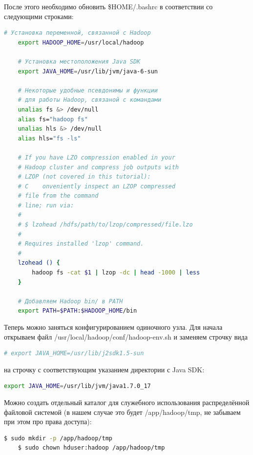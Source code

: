 \documentclass[12pt,a4paper]{extarticle} %
\begin{document}
\noindent После этого необходимо обновить \$HOME/.bashrc в соответствии со следующими строками:
\begin{lstlisting}[language=sh]
    # Установка переменной, связанной с Hadoop
    export HADOOP_HOME=/usr/local/hadoop

    # Установка местоположения Java SDK
    export JAVA_HOME=/usr/lib/jvm/java-6-sun

    # Некоторые удобные псевдонимы и функции
    # для работы Hadoop, связаной с командами
    unalias fs &> /dev/null
    alias fs="hadoop fs"
    unalias hls &> /dev/null
    alias hls="fs -ls"

    # If you have LZO compression enabled in your 
    # Hadoop cluster and compress job outputs with 
    # LZOP (not covered in this tutorial):
    # C    onveniently inspect an LZOP compressed 
    # file from the command
    # line; run via:
    #
    # $ lzohead /hdfs/path/to/lzop/compressed/file.lzo
    #
    # Requires installed 'lzop' command.
    #
    lzohead () {
        hadoop fs -cat $1 | lzop -dc | head -1000 | less
    }

    # Добавляем Hadoop bin/ в PATH
    export PATH=$PATH:$HADOOP_HOME/bin
\end{lstlisting}

\noindent Теперь можно заняться конфигурированием одиночного узла. Для начала открываем файл /usr/local/hadoop/conf/hadoop-env.sh и заменяем строчку вида
\begin{lstlisting}[language=sh]
    # export JAVA_HOME=/usr/lib/j2sdk1.5-sun
\end{lstlisting}
на строчку с соответствующим указанием директории с Java SDK:
\begin{lstlisting}[language=sh]
    export JAVA_HOME=/usr/lib/jvm/java1.7.0_17
\end{lstlisting}

\noindent Можно создать отдельный каталог для служебного использования распределённой файловой системой (в нашем случае это будет /app/hadoop/tmp, не забываем при этом про права доступа):
\begin{lstlisting}[language=sh]
    $ sudo mkdir -p /app/hadoop/tmp
    $ sudo chown hduser:hadoop /app/hadoop/tmp
\end{lstlisting}
\end{document}
